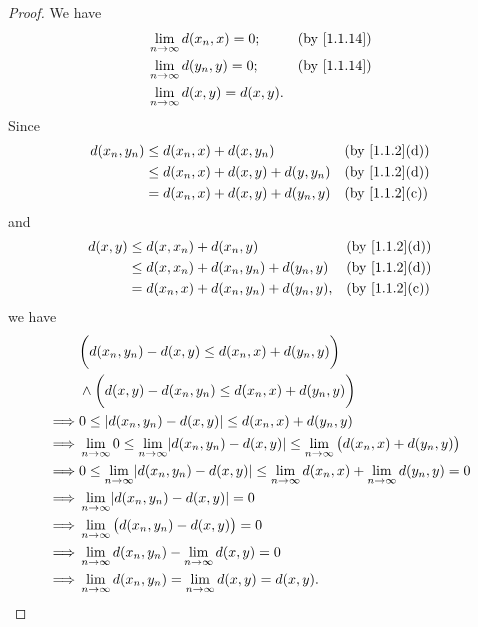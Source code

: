 \begin{proof}
  We have
  \begin{align*}
     & \lim_{n \to \infty} d(x_n, x) = 0;       &  & \text{(by \cref{1.1.14})} \\
     & \lim_{n \to \infty} d(y_n, y) = 0;       &  & \text{(by \cref{1.1.14})} \\
     & \lim_{n \to \infty} d(x, y)   = d(x, y).
  \end{align*}
  Since
  \begin{align*}
    d(x_n, y_n) & \leq d(x_n, x) + d(x, y_n)           &  & \text{(by \cref{1.1.2}(d))} \\
                & \leq d(x_n, x) + d(x, y) + d(y, y_n) &  & \text{(by \cref{1.1.2}(d))} \\
                & = d(x_n, x) + d(x, y) + d(y_n, y)    &  & \text{(by \cref{1.1.2}(c))}
  \end{align*}
  and
  \begin{align*}
    d(x, y) & \leq d(x, x_n) + d(x_n, y)               &  & \text{(by \cref{1.1.2}(d))} \\
            & \leq d(x, x_n) + d(x_n, y_n) + d(y_n, y) &  & \text{(by \cref{1.1.2}(d))} \\
            & = d(x_n, x) + d(x_n, y_n) + d(y_n, y),   &  & \text{(by \cref{1.1.2}(c))}
  \end{align*}
  we have
  \begin{align*}
             & \bigg(d(x_n, y_n) - d(x, y) \leq d(x_n, x) + d(y_n, y)\bigg)                                                                        \\
             & \land \bigg(d(x, y) - d(x_n, y_n) \leq d(x_n, x) + d(y_n, y)\bigg)                                                                  \\
    \implies & 0 \leq \abs{d(x_n, y_n) - d(x, y)} \leq d(x_n, x) + d(y_n, y)                                                                       \\
    \implies & \lim_{n \to \infty} 0 \leq \lim_{n \to \infty} \abs{d(x_n, y_n) - d(x, y)} \leq \lim_{n \to \infty} \big(d(x_n, x) + d(y_n, y)\big) \\
    \implies & 0 \leq \lim_{n \to \infty} \abs{d(x_n, y_n) - d(x, y)} \leq \lim_{n \to \infty} d(x_n, x) + \lim_{n \to \infty} d(y_n, y) = 0       \\
    \implies & \lim_{n \to \infty} \abs{d(x_n, y_n) - d(x, y)} = 0                                                                                 \\
    \implies & \lim_{n \to \infty} \big(d(x_n, y_n) - d(x, y)\big) = 0                                                                             \\
    \implies & \lim_{n \to \infty} d(x_n, y_n) - \lim_{n \to \infty} d(x, y) = 0                                                                   \\
    \implies & \lim_{n \to \infty} d(x_n, y_n) = \lim_{n \to \infty} d(x, y) = d(x, y).
  \end{align*}
\end{proof}